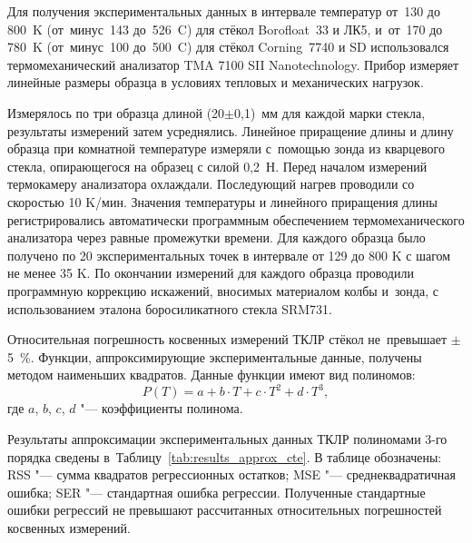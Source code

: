 Для получения экспериментальных данных в интервале температур
от~130 до 800~K (от~минус~143 до~526~{\textdegree}C)
для стёкол Borofloat~33 и ЛК5,
и~от~170 до 780~K (от~минус~100 до~500~{\textdegree}C)
для стёкол Corning~7740 и SD
использовался термомеханический анализатор TMA 7100 SII
Nanotechnology. Прибор измеряет линейные размеры образца в условиях
тепловых и механических нагрузок.

Измерялось по три образца длиной (20$\pm$0,1)~мм для каждой марки
стекла, результаты измерений затем усреднялись.
Линейное приращение длины и длину образца при комнатной температуре
измеряли с~помощью зонда из кварцевого стекла, опирающегося на образец
с силой 0,2~Н.
Перед началом измерений термокамеру анализатора охлаждали.
Последующий нагрев проводили со скоростью 10 K/мин.
Значения температуры и линейного приращения длины регистрировались
автоматически программным обеспечением термомеханического анализатора
через равные промежутки времени.
Для каждого образца было получено по 20 экспериментальных точек в
интервале от 129 до 800 K с шагом не менее 35 K.
По окончании измерений для каждого образца проводили программную
коррекцию искажений, вносимых материалом колбы и~зонда, с
использованием эталона боросиликатного стекла SRM731.

Относительная погрешность косвенных измерений
ТКЛР
стёкол не~превышает
${\pm}$5~\%.
Функции, аппроксимирующие экспериментальные данные,
получены методом наименьших квадратов. Данные функции имеют вид полиномов:
\begin{equation*}\label{eq:polynom_sample}
    P(T) = a + b \cdot T + c \cdot T^2 + d \cdot T^3,
\end{equation*}
где $a$, $b$, $c$, $d$ "--- коэффициенты полинома.

Результаты аппроксимации экспериментальных данных ТКЛР
полиномами 3-го порядка
сведены
в~Таблицу~\ref{tab:results_approx_cte}.
В таблице обозначены: RSS "--- сумма квадратов регрессионных остатков; MSE "--- среднеквадратичная ошибка; SER "--- стандартная ошибка регрессии.
Полученные стандартные ошибки регрессий не превышают рассчитанных относительных
погрешностей косвенных измерений.

